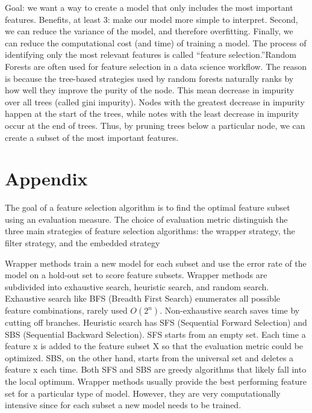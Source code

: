 \documentclass[preprint,12pt]{elsarticle}
\begin{document}
Goal: we want a way to create a model that only includes the most important features. Benefits, at least 3:
make our model more simple to interpret. Second, we can reduce the variance of the model, and therefore overfitting. Finally, we can reduce the computational cost (and time) of training a model. The process of identifying only the most relevant features is called “feature selection.”Random Forests are often used for feature selection in a data science workflow. The reason is because the tree-based strategies used by random forests naturally ranks by how well they improve the purity of the node. This mean decrease in impurity over all trees (called gini impurity). Nodes with the greatest decrease in impurity happen at the start of the trees, while notes with the least decrease in impurity occur at the end of trees. Thus, by pruning trees below a particular node, we can create a subset of the most important features.
\cite{breiman2001random}




\appendix

\section{Appendix}
\label{se:appe}
The goal of a feature selection algorithm is to find the optimal feature subset using an evaluation measure.  The choice of evaluation metric distinguish the three main strategies of feature selection algorithms: the wrapper strategy, the filter strategy, and the embedded strategy

Wrapper methods train a new model for each subset and use the error rate of the model on a hold-out set to score feature subsets. Wrapper methods are subdivided into exhaustive search, heuristic search, and random search.
Exhaustive search like BFS (Breadth First Search) enumerates all possible feature combinations, rarely used $O(2^n)$. Non-exhaustive search  saves time by cutting off branches.
Heuristic search has SFS (Sequential Forward Selection) and SBS (Sequential Backward Selection). SFS starts from an empty set. Each time a feature x is added to the feature subset X so that the evaluation metric could be optimized. SBS, on the other hand, starts from the universal set and deletes a feature x each time. Both SFS and SBS are greedy algorithms that likely fall into the local optimum. Wrapper methods usually provide the best performing feature set for a particular type of model. However, they are very computationally intensive since for each subset a new model needs to be trained.
\end{document}
